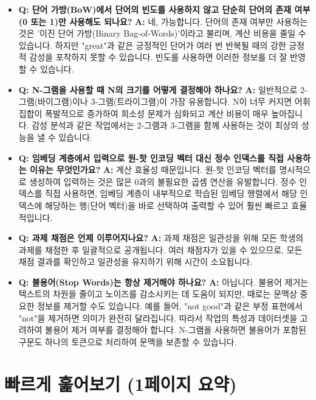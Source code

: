 \documentclass[11pt,a4paper]{article}
\begin{document}
\begin{itemize}
    \item \textbf{Q: 단어 가방(BoW)에서 단어의 빈도를 사용하지 않고 단순히 단어의 존재 여부(0 또는 1)만 사용해도 되나요?}
        \textbf{A:} 네, 가능합니다. 단어의 존재 여부만 사용하는 것은 '이진 단어 가방(Binary Bag-of-Words)'이라고 불리며, 계산 비용을 줄일 수 있습니다. 하지만 "great"과 같은 긍정적인 단어가 여러 번 반복될 때의 강한 긍정적 감성을 포착하지 못할 수 있습니다. 빈도를 사용하면 이러한 정보를 더 잘 반영할 수 있습니다.

    \item \textbf{Q: N-그램을 사용할 때 N의 크기를 어떻게 결정해야 하나요?}
        \textbf{A:} 일반적으로 2-그램(바이그램)이나 3-그램(트라이그램)이 가장 유용합니다. N이 너무 커지면 어휘 집합이 폭발적으로 증가하여 희소성 문제가 심화되고 계산 비용이 매우 높아집니다. 감성 분석과 같은 작업에서는 2-그램과 3-그램을 함께 사용하는 것이 최상의 성능을 낼 수 있습니다.

    \item \textbf{Q: 임베딩 계층에서 입력으로 원-핫 인코딩 벡터 대신 정수 인덱스를 직접 사용하는 이유는 무엇인가요?}
        \textbf{A:} 계산 효율성 때문입니다. 원-핫 인코딩 벡터를 명시적으로 생성하여 입력하는 것은 많은 0과의 불필요한 곱셈 연산을 유발합니다. 정수 인덱스를 직접 사용하면, 임베딩 계층이 내부적으로 학습된 임베딩 행렬에서 해당 인덱스에 해당하는 행(단어 벡터)을 바로 선택하여 출력할 수 있어 훨씬 빠르고 효율적입니다.

    \item \textbf{Q: 과제 채점은 언제 이루어지나요?}
        \textbf{A:} 과제 채점은 일관성을 위해 모든 학생의 과제를 채점한 후 일괄적으로 공개됩니다. 여러 채점자가 있을 수 있으므로, 모든 채점 결과를 확인하고 일관성을 유지하기 위해 시간이 소요됩니다.

    \item \textbf{Q: 불용어(Stop Words)는 항상 제거해야 하나요?}
        \textbf{A:} 아닙니다. 불용어 제거는 텍스트의 차원을 줄이고 노이즈를 감소시키는 데 도움이 되지만, 때로는 문맥상 중요한 정보를 제거할 수도 있습니다. 예를 들어, "not good"과 같은 부정 표현에서 "not"을 제거하면 의미가 완전히 달라집니다. 따라서 작업의 특성과 데이터셋을 고려하여 불용어 제거 여부를 결정해야 합니다. N-그램을 사용하면 불용어가 포함된 구문도 하나의 토큰으로 처리하여 문맥을 보존할 수 있습니다.
\end{itemize}

\newpage
\section{빠르게 훑어보기 (1페이지 요약)}
\end{document}
